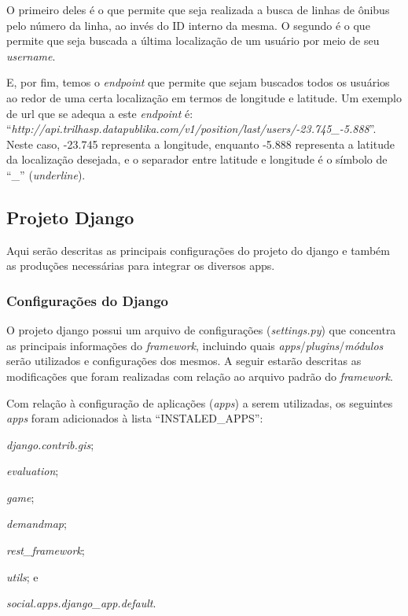 O primeiro deles é o que permite que seja realizada a busca de linhas de ônibus pelo número da linha, ao invés do ID interno da mesma. O segundo é o que permite que seja buscada a última localização de um usuário por meio de seu \textit{username}.

E, por fim, temos o \textit{endpoint} que permite que sejam buscados todos os usuários ao redor de uma certa localização em termos de longitude e latitude. Um exemplo de url que se adequa a este \textit{endpoint} é:
``\textit{http://api.trilhasp.datapublika.com/v1/position/last/users/-23.745\_-5.888}''. Neste caso, -23.745 representa a longitude, enquanto -5.888 representa a latitude da localização desejada, e o separador entre latitude e longitude é o símbolo de ``\_'' (\textit{underline}).
\clearpage
\subsection{Projeto Django}
Aqui serão descritas as principais configurações do projeto do \gls{django} e também as produções necessárias para integrar os diversos apps.

\subsubsection{Configurações do Django}
O projeto \gls{django} possui um arquivo de configurações (\textit{settings.py}) que concentra as principais informações do \textit{framework}, incluindo quais \textit{apps}/\textit{plugins}/\textit{módulos} serão utilizados e configurações dos mesmos. A seguir estarão descritas as modificações que foram realizadas com relação ao arquivo padrão do \textit{framework}.

Com relação à configuração de aplicações (\textit{apps}) a serem utilizadas, os seguintes \textit{apps} foram adicionados à lista ``INSTALED\_APPS'':
    \begin{enumerate*}[label=\itshape\alph*\upshape)]
        \item \textit{django.contrib.gis};
        \item \textit{evaluation};
        \item \textit{game};
        \item \textit{demandmap};
        \item \textit{rest\_framework};
        \item \textit{utils}; e
        \item \textit{social.apps.django\_app.default}.
    \end{enumerate*}

